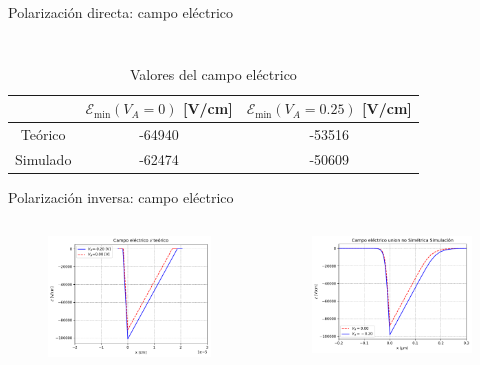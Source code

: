 \documentclass[aspectratio=169,xcolor=dvipsnames]{beamer}
\begin{document}
\begin{frame}{Polarización directa: campo eléctrico}
\begin{columns}
\begin{column}{0.5\textwidth}
\begin{figure}
        \end{figure}
    \end{column}
    \end{columns}
    \begin{table}
        \caption{Valores del campo eléctrico}
        \begin{tabular}{c|cc}
            & $\mathcal{E}_{\min} (V_A=0)$ [V/cm] & $\mathcal{E}_{\min} (V_A=0.25)$ [V/cm]   \\ \hline
            Teórico & -64940 & -53516 \\
            Simulado & -62474 & -50609
        \end{tabular}
    \end{table}
\end{frame}
\begin{frame}{Polarización inversa: campo eléctrico}
    \begin{columns}
    \begin{column}{0.5\textwidth}
        \begin{figure}
            \includegraphics[width=0.90\linewidth]{Teorico/Campo_Electrico-Inversa.pdf}
        \end{figure}
    \end{column}
    \begin{column}{0.5\textwidth}
        \begin{figure}
            \includegraphics[width=0.90\linewidth]{Inversa/Campo_Electrico-Inversa.pdf}

\end{figure}
\end{column}
\end{columns}
\end{frame}
\end{document}
